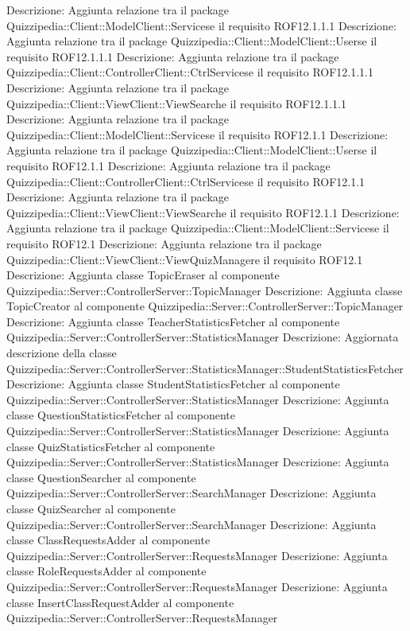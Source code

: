 Descrizione: Aggiunta relazione tra il package Quizzipedia::Client::ModelClient::Servicese il requisito ROF12.1.1.1 
Descrizione: Aggiunta relazione tra il package Quizzipedia::Client::ModelClient::Userse il requisito ROF12.1.1.1 
Descrizione: Aggiunta relazione tra il package Quizzipedia::Client::ControllerClient::CtrlServicese il requisito ROF12.1.1.1 
Descrizione: Aggiunta relazione tra il package Quizzipedia::Client::ViewClient::ViewSearche il requisito ROF12.1.1.1 
Descrizione: Aggiunta relazione tra il package Quizzipedia::Client::ModelClient::Servicese il requisito ROF12.1.1 
Descrizione: Aggiunta relazione tra il package Quizzipedia::Client::ModelClient::Userse il requisito ROF12.1.1 
Descrizione: Aggiunta relazione tra il package Quizzipedia::Client::ControllerClient::CtrlServicese il requisito ROF12.1.1 
Descrizione: Aggiunta relazione tra il package Quizzipedia::Client::ViewClient::ViewSearche il requisito ROF12.1.1 
Descrizione: Aggiunta relazione tra il package Quizzipedia::Client::ModelClient::Servicese il requisito ROF12.1 
Descrizione: Aggiunta relazione tra il package Quizzipedia::Client::ViewClient::ViewQuizManagere il requisito ROF12.1 
Descrizione: Aggiunta classe TopicEraser al componente Quizzipedia::Server::ControllerServer::TopicManager 
Descrizione: Aggiunta classe TopicCreator al componente Quizzipedia::Server::ControllerServer::TopicManager 
Descrizione: Aggiunta classe TeacherStatisticsFetcher al componente Quizzipedia::Server::ControllerServer::StatisticsManager 
Descrizione: Aggiornata descrizione della classe Quizzipedia::Server::ControllerServer::StatisticsManager::StudentStatisticsFetcher 
Descrizione: Aggiunta classe StudentStatisticsFetcher al componente Quizzipedia::Server::ControllerServer::StatisticsManager 
Descrizione: Aggiunta classe QuestionStatisticsFetcher al componente Quizzipedia::Server::ControllerServer::StatisticsManager 
Descrizione: Aggiunta classe QuizStatisticsFetcher al componente Quizzipedia::Server::ControllerServer::StatisticsManager 
Descrizione: Aggiunta classe QuestionSearcher al componente Quizzipedia::Server::ControllerServer::SearchManager 
Descrizione: Aggiunta classe QuizSearcher al componente Quizzipedia::Server::ControllerServer::SearchManager 
Descrizione: Aggiunta classe ClassRequestsAdder al componente Quizzipedia::Server::ControllerServer::RequestsManager 
Descrizione: Aggiunta classe RoleRequestsAdder al componente Quizzipedia::Server::ControllerServer::RequestsManager 
Descrizione: Aggiunta classe InsertClassRequestAdder al componente Quizzipedia::Server::ControllerServer::RequestsManager 
